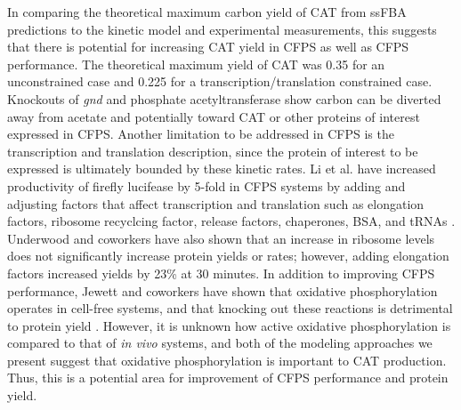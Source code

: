 \documentclass[12pt]{article}
\begin{document}
In comparing the theoretical maximum carbon yield of CAT from ssFBA predictions to the kinetic model and experimental measurements, this suggests that there is potential for increasing CAT yield in CFPS as well as CFPS performance. 
The theoretical maximum yield of CAT was 0.35 for an unconstrained case and 0.225 for a transcription/translation constrained case. 
Knockouts of \textit{gnd} and phosphate acetyltransferase show carbon can be diverted away from acetate and potentially toward CAT or other proteins of interest expressed in CFPS. 
Another limitation to be addressed in CFPS is the transcription and translation description, since the protein of interest to be expressed is ultimately bounded by these kinetic rates.
Li et al. have increased productivity of firefly lucifease by 5-fold in CFPS systems by adding and adjusting factors that affect transcription and translation such as elongation factors, ribosome recyclcing factor, release factors, chaperones, BSA, and tRNAs \cite{2014_li_PlosOne}.
Underwood and coworkers have also shown that an increase in ribosome levels does not significantly increase protein yields or rates; however, adding elongation factors increased yields by 23\% at 30 minutes\cite{2005_underwood_biotech}.
In addition to improving CFPS performance, Jewett and coworkers have shown that oxidative phosphorylation operates in cell-free systems, and that knocking out these reactions is detrimental to protein yield \cite{2008_jewett_molsysbiol}.
However, it is unknown how active oxidative phosphorylation is compared to that of \textit{in vivo} systems, and both of the modeling approaches we present suggest that oxidative phosphorylation is important to CAT production.
Thus, this is a potential area for improvement of CFPS performance and protein yield.   

\end{document}
